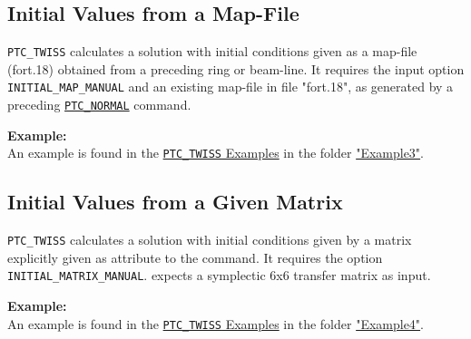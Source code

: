 \subsection{Initial Values from a Map-File}
\label{subsec:from-map-file}

\texttt{PTC\_TWISS} calculates a solution with initial
conditions given as a map-file (fort.18) obtained from a
preceding ring or beam-line. It requires the input option
\texttt{INITIAL\_MAP\_MANUAL} and an existing map-file
in file "fort.18", as generated by a preceding
\hyperref[sec:ptc-normal]{\texttt{PTC\_NORMAL}} command. 


\textbf{Example:} \\
An example is found in the
\href{http://madx.web.cern.ch/madx/madX/examples/ptc_twiss/}
{\texttt{PTC\_TWISS} Examples} in the folder
\href{http://madx.web.cern.ch/madx/madX/examples/ptc_twiss/Example3}
{"Example3"}. 


\subsection{Initial Values from a Given Matrix}
\label{subsec:from-given-matrix}

\texttt{PTC\_TWISS} calculates a solution with initial conditions given
by a matrix explicitly given as attribute to the command. 
It requires the option \texttt{INITIAL\_MATRIX\_MANUAL}. 
\madx expects a symplectic 6x6 transfer matrix as input. 


\textbf{Example:} \\
An example is found in the
\href{http://madx.web.cern.ch/madx/madX/examples/ptc_twiss/}
{\texttt{PTC\_TWISS} Examples} in the folder
\href{http://madx.web.cern.ch/madx/madX/examples/ptc_twiss/Example4}
{"Example4"}. 


